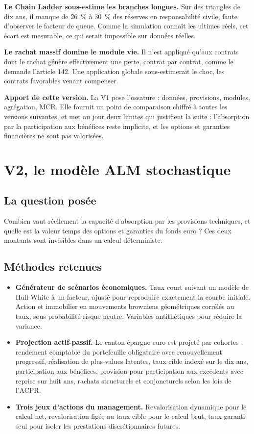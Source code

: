 \documentclass[11pt,a4paper]{article}
\newcommand{\apport}[1]{\par\smallskip\noindent\textcolor{vertfonce}{\textbf{Apport de cette
version.}} #1\par\smallskip}
\begin{document}
\textbf{Le Chain Ladder sous-estime les branches longues.} Sur des triangles de dix ans, il manque
de \qty{26}{\percent} à \qty{30}{\percent} des réserves en responsabilité civile, faute d'observer
le facteur de queue. Comme la simulation connaît les ultimes réels, cet écart est mesurable, ce
qui serait impossible sur données réelles.

\textbf{Le rachat massif domine le module vie.} Il n'est appliqué qu'aux contrats dont le rachat
génère effectivement une perte, contrat par contrat, comme le demande l'article 142. Une
application globale sous-estimerait le choc, les contrats favorables venant compenser.

\apport{La V1 pose l'ossature : données, provisions, modules, agrégation, MCR. Elle fournit un
point de comparaison chiffré à toutes les versions suivantes, et met au jour deux limites qui
justifient la suite : l'absorption par la participation aux bénéfices reste implicite, et les
options et garanties financières ne sont pas valorisées.}

\section{V2, le modèle ALM stochastique}

\subsection{La question posée}

Combien vaut réellement la capacité d'absorption par les provisions techniques, et quelle est la
valeur temps des options et garanties du fonds euro ? Ces deux montants sont invisibles dans un
calcul déterministe.

\subsection{Méthodes retenues}

\begin{itemize}
\item \textbf{Générateur de scénarios économiques.} Taux court suivant un modèle de Hull-White à
      un facteur, ajusté pour reproduire exactement la courbe initiale. Action et immobilier en
      mouvements browniens géométriques corrélés au taux, sous probabilité risque-neutre.
      Variables antithétiques pour réduire la variance.
\item \textbf{Projection actif-passif.} Le canton épargne euro est projeté par cohortes :
      rendement comptable du portefeuille obligataire avec renouvellement progressif, réalisation
      de plus-values latentes, taux cible indexé sur le dix ans, participation aux bénéfices,
      provision pour participation aux excédents avec reprise sur huit ans, rachats structurels et
      conjoncturels selon les lois de l'ACPR.
\item \textbf{Trois jeux d'actions du management.} Revalorisation dynamique pour le calcul net,
      revalorisation figée au taux cible pour le calcul brut, taux garanti seul pour isoler les
      prestations discrétionnaires futures.
\end{itemize}
\end{document}
